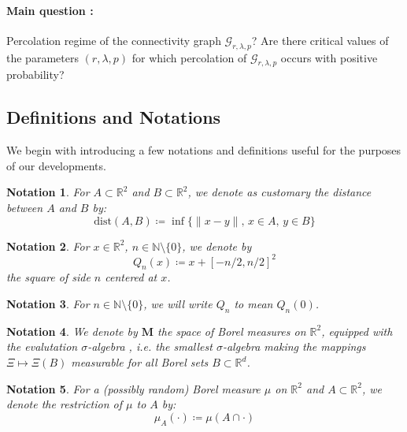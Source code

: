\documentclass[11pt,a4paper]{amsart}
\theoremstyle{exampstyle}
\newtheorem{Remark}{Remark}
\theoremstyle{exampnotations}
\newtheorem{Notation}{Notation}
\begin{document}

\paragraph*{Main question :} Percolation regime of the connectivity graph $\mathcal{G}_{r,\lambda, p}$? Are there critical values of the parameters $(r,\lambda,p)$ for which percolation of $\mathcal{G}_{r,\lambda, p}$ occurs with positive probability?

\subsection{Definitions and Notations}
We begin with introducing a few notations and definitions useful for the purposes of our developments.
 \begin{Notation}
 For $A \subset \mathbb{R}^{2}$ and $B \subset \mathbb{R}^{2}$, we denote as customary the distance between $A$ and $B$ by:
 $$\text{dist}(A,B) \coloneqq \inf \lbrace \lVert x - y \rVert , \,  x \in A, \,  y \in B \rbrace$$
 \end{Notation}

\begin{Notation}
For $x \in \mathbb{R}^{2}$, $n \in \mathbb{N} \setminus \lbrace 0 \rbrace$, we denote by $$Q_n(x) \coloneqq x + \left[-n/2,n/2\right]^{2}$$ the square of side $n$ centered at $x$.
\end{Notation}

\begin{Notation}
For $n \in \mathbb{N} \setminus \lbrace 0 \rbrace$, we will write 
$Q_n$ to mean $Q_n(0)$.
\end{Notation}

\begin{Notation}
We denote by $\mathbf{M}$ the space of Borel measures on $\mathbb{R}^{2}$, equipped with the evalutation $\sigma$-algebra \cite[Section 13.1]{last2017lectures}, i.e. the smallest $\sigma$-algebra making the mappings $\Xi \mapsto \Xi(B)$ measurable for all Borel sets $B \subset \mathbb{R}^{d}$.
\end{Notation}

\begin{Notation}
For a (possibly random) Borel measure $\mu$ on $\mathbb{R}^{2}$ and $A \subset \mathbb{R}^{2}$, we denote the restriction of $\mu$ to $A$ by: $$\mu_A(\cdot) \coloneqq \mu(A \cap \cdot)$$
\end{Notation}
\end{document}
